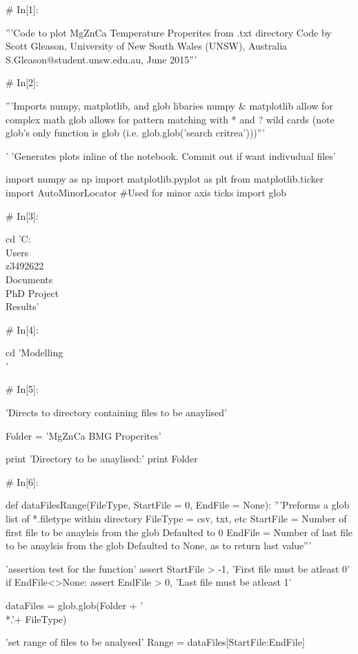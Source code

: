 \documentclass[a4paper,8pt]{article}
\begin{document}
\begin{python}
# In[1]:

'''Code to plot MgZnCa Temperature Properites from .txt directory
Code by Scott Gleason, University of New South Wales (UNSW), Australia 
S.Gleason@student.unsw.edu.au, June 2015'''


# In[2]:

'''Imports numpy, matplotlib, and glob libaries 
numpy & matplotlib allow for complex math
glob allows for pattern matching with * and ? wild cards
(note glob's only function is glob (i.e. glob.glob('search critrea')))'''

'%
'Generates plots inline of the notebook. Commit out if want indivudual files'

import numpy as np
import matplotlib.pyplot as plt
from matplotlib.ticker import AutoMinorLocator #Used for minor axis ticks
import glob


# In[3]:

cd 'C:\\Users\\z3492622\\Documents\\PhD Project\\Results'


# In[4]:

cd 'Modelling\\'


# In[5]:

'Directs to directory containing files to be anaylised'

Folder = 'MgZnCa BMG Properites'

print 'Directory to be anaylised:'
print Folder


# In[6]:

def dataFilesRange(FileType, StartFile = 0, EndFile = None):
'''Preforms a glob list of *.filetype within directory
FileType = csv, txt, etc
StartFile = Number of first file to be anaylsis from the glob
Defaulted to 0
EndFile = Number of last file to be anaylsis from the glob
Defaulted to None, as to return last value'''

'assertion test for the function'
assert StartFile > -1, 'First file must be atleast 0'
if EndFile<>None:
assert EndFile > 0, 'Last file must be atleast 1'

dataFiles = glob.glob(Folder + '\\*.'+ FileType)

'set range of files to be analysed'
Range = dataFiles[StartFile:EndFile]


\end{python}
\end{document}
